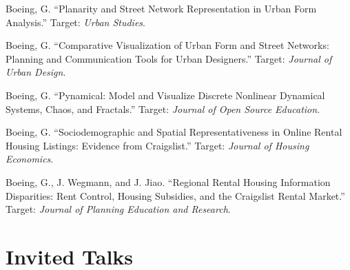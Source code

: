 \documentclass{academiccv}
\begin{document}
\begin{tablist}
	
\item[\the\year] \tab Boeing, G. \enquote{Planarity and Street Network Representation in Urban Form Analysis.} Target: \emph{Urban Studies}.

\item[\the\year] \tab Boeing, G. \enquote{Comparative Visualization of Urban Form and Street Networks: Planning and Communication Tools for Urban Designers.} Target: \emph{Journal of Urban Design}.

\item[\the\year] \tab Boeing, G. \enquote{Pynamical: Model and Visualize Discrete Nonlinear Dynamical Systems, Chaos, and Fractals.} Target: \emph{Journal of Open Source Education}.

\item[\the\year] \tab Boeing, G. \enquote{Sociodemographic and Spatial Representativeness in Online Rental Housing Listings: Evidence from Craigslist.} Target: \emph{Journal of Housing Economics}.

\item[\the\year] \tab Boeing, G., J. Wegmann, and J. Jiao. \enquote{Regional Rental Housing Information Disparities: Rent Control, Housing Subsidies, and the Craigslist Rental Market.} Target: \emph{Journal of Planning Education and Research}.
	
\end{tablist}



\section*{Invited Talks}
\end{document}
